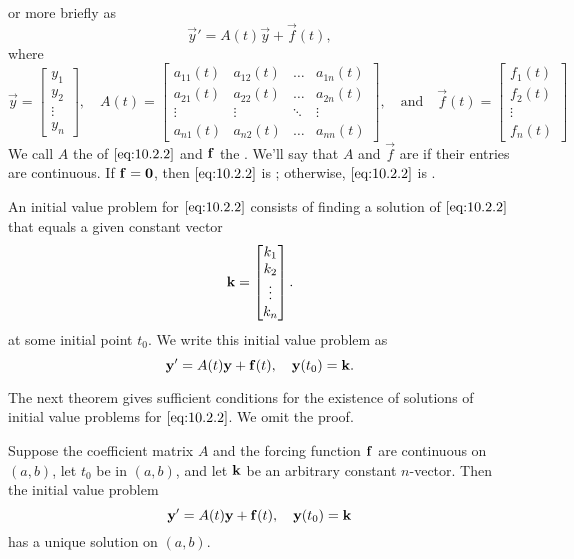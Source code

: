 \documentclass{ximera}
\begin{document}
or more briefly as
\begin{equation} \label{eq:10.2.2}
\vec{y}'=A(t)\vec{y}+\vec{f}(t),
\end{equation}
where
$$
\vec{y}=\begin{bmatrix}y_1\\y_2\\\vdots\\y_n\end{bmatrix},\quad
A(t)=\begin{bmatrix}a_{11}(t)&a_{12}(t)&\dots &a_{1n}(t)\\
a_{21}(t)&a_{22}(t)&\dots &a_{2n}(t)\\
\vdots &\vdots &\ddots &\vdots\\
a_{n1}(t)&a_{n2}(t)&\dots &a_{nn}(t)\end{bmatrix},\quad\mbox{and}\quad\vec{f}(t)=\begin{bmatrix}f_1(t)\\f_2(t)\\\vdots\\f_n(t)\end{bmatrix}
$$
We call $A$  the  of $\eqref{eq:10.2.2}$ and
${\bf f}$  the .   We'll say that $A$
and $\vec{f}$ are  if their entries are continuous.
If ${\bf f}={\bf 0}$, then $\eqref{eq:10.2.2}$ is ;
otherwise, $\eqref{eq:10.2.2}$ is .

An  initial value problem  for $\eqref{eq:10.2.2}$ consists of
finding a solution of $\eqref{eq:10.2.2}$ that equals a given constant
vector
$$
{\bf k} =\begin{bmatrix}k_1\\k_2\\\vdots\\k_n\end{bmatrix}.
$$
at some initial point $t_0$. We write this initial value problem as
$$
{\bf y}'=A(t){\bf y}+{\bf f}(t), \quad  {\bf y}(t_0)={\bf k}.
$$

The next theorem gives sufficient conditions for the existence
of solutions of initial value problems for $\eqref{eq:10.2.2}$. We omit the
proof.

\begin{theorem}\label{thmtype:10.2.1}
Suppose the coefficient matrix $A$ and the forcing function ${\bf
f}$ are continuous on $(a,b)$, let $t_0$ be in $(a,b)$, and let ${\bf
k}$ be an arbitrary constant $n$-vector. Then the initial value
problem
$$
{\bf y}'=A(t){\bf y}+{\bf f}(t), \quad  {\bf y}(t_0)={\bf k}
$$
 has a unique solution on $(a,b)$.
\end{theorem}
\end{document}

